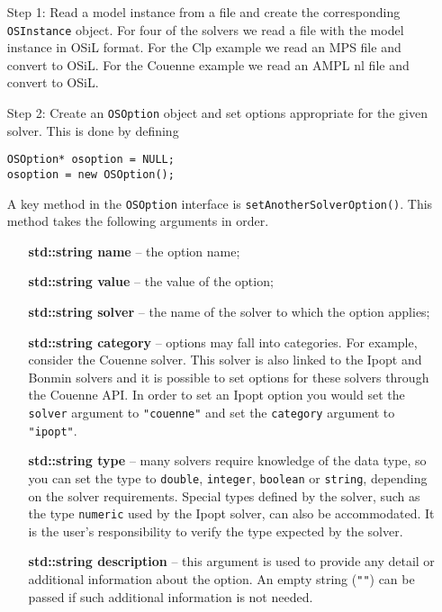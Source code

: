 \documentclass[11pt]{article}
\renewcommand{\{}{{\char"7B}}
\renewcommand{\}}{{\char"7D}}
\renewcommand{\^}{{\char"0D}}
\renewcommand{\'}{{\char"0D}}
\begin{document}
\begin{itemize}
\item[Step 1:]  Read a model instance from a file  and create the corresponding {\tt OSInstance} object.
For four of the solvers we read a file with the model instance in OSiL format. For the Clp example 
we read an MPS file and convert to OSiL. For the Couenne example we read an AMPL nl file and convert 
to OSiL.

\item[Step 2:]  Create an {\tt OSOption} object and set options appropriate for the given solver.   
This is done by defining

\begin{verbatim}
OSOption* osoption = NULL;
osoption = new OSOption();
\end{verbatim}

A key method in the {\tt OSOption} interface is {\tt setAnotherSolverOption()}.  This method 
takes the following arguments in order.

\begin{itemize}
\item[] {\bf std::string name} -- the option name;
\item[] {\bf std::string value}  -- the value of the option;
\item[] {\bf std::string solver} -- the name of the solver to which the option applies;
\item[] {\bf std::string category} -- options may fall into categories. For example, consider the  
 Couenne solver.  This solver is also linked to the Ipopt and Bonmin solvers and  it is possible 
to set options for these solvers through the Couenne API. In order to set an Ipopt option 
you would set the {\tt solver} argument to {\tt "couenne"} and set the {\tt category} argument 
to {\tt "ipopt"}.

\item[] {\bf std::string type} -- many solvers require knowledge of the data type, so you can set 
the type to {\tt double}, {\tt integer}, {\tt boolean} or {\tt string}, depending on the solver 
requirements. Special types defined by the solver, such as the type {\tt numeric} used by the
Ipopt solver, can also be accommodated. It is the user's responsibility to verify the type
expected by the solver.


\item[] {\bf std::string  description} -- this argument is used to provide any detail or 
additional information about the option. An empty string ({\tt""}) can be passed if such additional
information is not needed.
\end{itemize}


\end{itemize}
\end{document}
